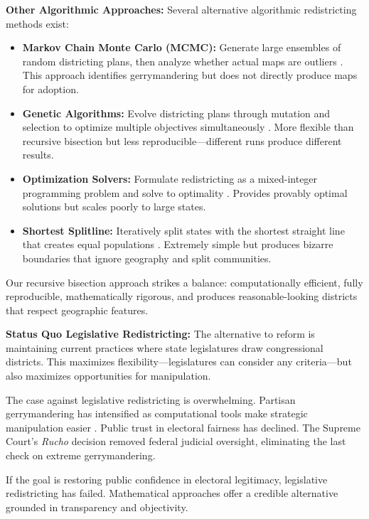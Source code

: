 \textbf{Other Algorithmic Approaches:} Several alternative algorithmic redistricting methods exist:

\begin{itemize}
    \item \textbf{Markov Chain Monte Carlo (MCMC):} Generate large ensembles of random districting plans, then analyze whether actual maps are outliers \cite{fifield2020automated}. This approach identifies gerrymandering but does not directly produce maps for adoption.
    \item \textbf{Genetic Algorithms:} Evolve districting plans through mutation and selection to optimize multiple objectives simultaneously \cite{liu2016pear}. More flexible than recursive bisection but less reproducible—different runs produce different results.
    \item \textbf{Optimization Solvers:} Formulate redistricting as a mixed-integer programming problem and solve to optimality \cite{garfinkel1970optimal}. Provides provably optimal solutions but scales poorly to large states.
    \item \textbf{Shortest Splitline:} Iteratively split states with the shortest straight line that creates equal populations \cite{duchin2018gerrymandering}. Extremely simple but produces bizarre boundaries that ignore geography and split communities.
\end{itemize}

Our recursive bisection approach strikes a balance: computationally efficient, fully reproducible, mathematically rigorous, and produces reasonable-looking districts that respect geographic features.

\textbf{Status Quo Legislative Redistricting:} The alternative to reform is maintaining current practices where state legislatures draw congressional districts. This maximizes flexibility—legislatures can consider any criteria—but also maximizes opportunities for manipulation.

The case against legislative redistricting is overwhelming. Partisan gerrymandering has intensified as computational tools make strategic manipulation easier \cite{daley2021unrigging}. Public trust in electoral fairness has declined. The Supreme Court's \textit{Rucho} decision removed federal judicial oversight, eliminating the last check on extreme gerrymandering.

If the goal is restoring public confidence in electoral legitimacy, legislative redistricting has failed. Mathematical approaches offer a credible alternative grounded in transparency and objectivity.
